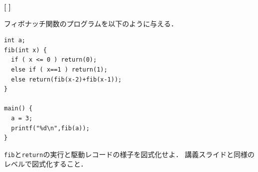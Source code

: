 \documentclass[dvipdfmx]{jarticle}
\newcounter{coffee}
\begin{document}
\begin{list}{{\bf [\,\,]}}{}
\newpage

 \item フィボナッチ関数のプログラムを以下のように与える．

       \begin{Verbatim}[frame=single]
int a;
fib(int x) {
  if ( x <= 0 ) return(0);
  else if ( x==1 ) return(1);
  else return(fib(x-2)+fib(x-1));
}

main() {
  a = 3;
  printf("%d\n",fib(a));
}
       \end{Verbatim}

       \verb|fib|と\verb|return|の実行と駆動レコードの様子を図式化せよ．
       講義スライドと同様のレベルで図式化すること．
\end{list}
\end{document}

